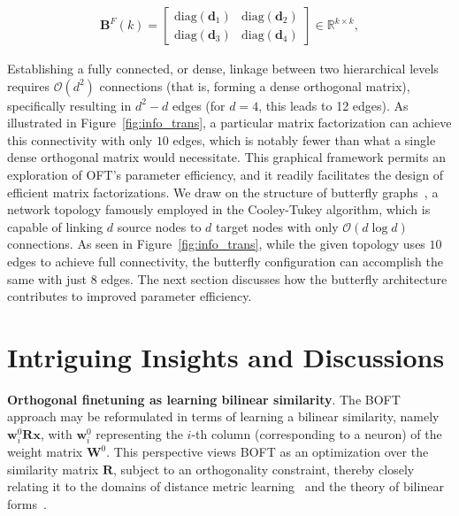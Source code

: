 

\begin{equation}\label{eq:but_factor}
\begin{aligned}
    \bm{B}^F(k)=\begin{bmatrix}
    \text{diag}(\bm{d}_1) & \text{diag}(\bm{d}_2) \\
    \text{diag}(\bm{d}_3) & \text{diag}(\bm{d}_4)
    \end{bmatrix}\in\mathbb{R}^{k\times k},
\end{aligned}
\end{equation}

Establishing a fully connected, or dense, linkage between two hierarchical levels requires $\mathcal{O}(d^2)$ connections (that is, forming a dense orthogonal matrix), specifically resulting in $d^2-d$ edges (for $d=4$, this leads to 12 edges). As illustrated in Figure~\ref{fig:info_trans}, a particular matrix factorization can achieve this connectivity with only $10$ edges, which is notably fewer than what a single dense orthogonal matrix would necessitate. This graphical framework permits an exploration of OFT's parameter efficiency, and it readily facilitates the design of efficient matrix factorizations. We draw on the structure of butterfly graphs~\cite{cooley1965algorithm}, a network topology famously employed in the Cooley-Tukey algorithm, which is capable of linking $d$ source nodes to $d$ target nodes with only $\mathcal{O}(d\log d)$ connections. As seen in Figure~\ref{fig:info_trans}, while the given topology uses $10$ edges to achieve full connectivity, the butterfly configuration can accomplish the same with just $8$ edges. The next section discusses how the butterfly architecture contributes to improved parameter efficiency.

\section{Intriguing Insights and Discussions}

\textbf{Orthogonal finetuning as learning bilinear similarity}. The BOFT approach may be reformulated in terms of learning a bilinear similarity, namely $\bm{w}^0_i\bm{R}\bm{x}$, with $\bm{w}^0_i$ representing the $i$-th column (corresponding to a neuron) of the weight matrix $\bm{W}^0$. This perspective views BOFT as an optimization over the similarity matrix $\bm{R}$, subject to an orthogonality constraint, thereby closely relating it to the domains of distance metric learning~\cite{xing2002distance} and the theory of bilinear forms~\cite{roman2005advanced}.



